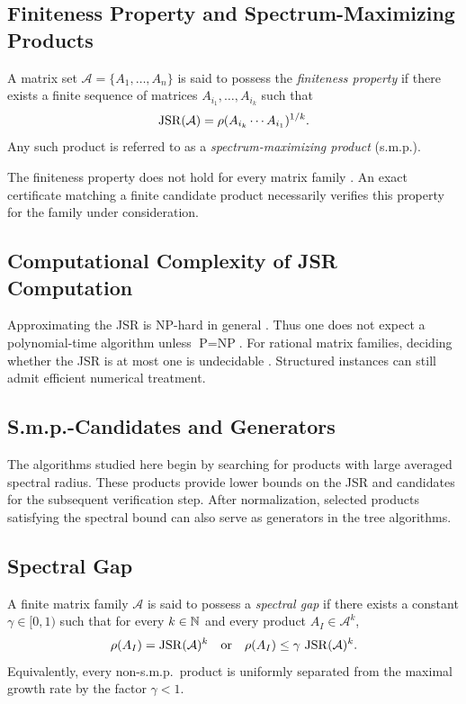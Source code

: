 \subsection*{Finiteness Property and Spectrum-Maximizing Products}
\begin{definition}\citep{LagariasWang1995FinitenessConjecture}
    \label{def:finitenessProperty}
    A matrix set $\mathcal{A} = \{ A_1, \dots, A_n \}$ is said to possess the \emph{finiteness property} if there exists a finite sequence of matrices $A_{i_1}, \dots, A_{i_k}$ such that
    \begin{equation}
        \operatorname{JSR}(\mathcal{A}) = \rho(A_{i_k} \cdots A_{i_1})^{1/k}.
    \end{equation}
    Any such product is referred to as a \emph{spectrum-maximizing product} (s.m.p.).
\end{definition}
The finiteness property does not hold for every matrix family \citep{BlondelTheysVladimirov2003CounterexampleFiniteness}.
An exact certificate matching a finite candidate product necessarily verifies this property for the family under consideration.

\subsection*{Computational Complexity of JSR Computation}

Approximating the JSR is NP-hard in general \citep{TsitsiklisBlondel1997HardToComputeJSR}.
Thus one does not expect a polynomial-time algorithm unless $\text{P}=\text{NP}$.
For rational matrix families, deciding whether the JSR is at most one is undecidable \citep{BlondelTsitsiklis2000BoundednessUndecidable}.
Structured instances can still admit efficient numerical treatment.

\subsection*{S.m.p.-Candidates and Generators}
The algorithms studied here begin by searching for products with large averaged spectral radius.
These products provide lower bounds on the JSR and candidates for the subsequent verification step.
After normalization, selected products satisfying the spectral bound can also serve as generators in the tree algorithms.

\subsection*{Spectral Gap}
\begin{definition}\citep[Definition 1.9]{MejstrikReif2025HybridApproachJSR}
    \label{def:spectralGap}
    A finite matrix family $\mathcal{A}$ is said to possess a \emph{spectral gap} if there exists a constant $\gamma \in [0,1)$ such that for every $k \in \mathbb{N}$ and every product $A_I \in \mathcal{A}^k$,
    \[
        \rho(A_I) = \operatorname{JSR}(\mathcal{A})^k
        \quad \text{or} \quad
        \rho(A_I) \leq \gamma\,\operatorname{JSR}(\mathcal{A})^k.
    \]
    Equivalently, every non-s.m.p.\ product is uniformly separated from the maximal growth rate by the factor $\gamma < 1$.
\end{definition}


